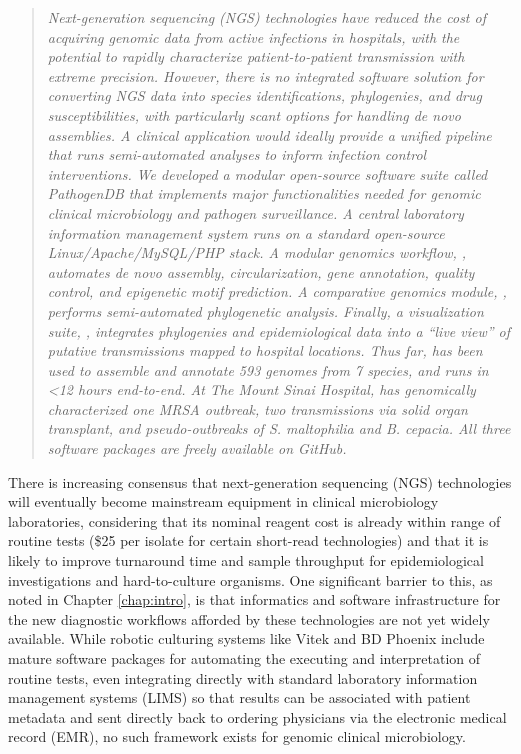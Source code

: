 \begin{quote}
\emph{Next-generation sequencing (NGS) technologies have reduced the cost of acquiring genomic data from active infections in hospitals, with the potential to rapidly characterize patient-to-patient transmission with extreme precision. However, there is no integrated software solution for converting NGS data into species identifications, phylogenies, and drug susceptibilities, with particularly scant options for handling \emph{de novo} assemblies. A clinical application would ideally provide a unified pipeline that runs semi-automated analyses to inform infection control interventions. We developed a modular open-source software suite called PathogenDB that implements major functionalities needed for genomic clinical microbiology and pathogen surveillance. A central laboratory information management system runs on a standard open-source Linux/Apache/MySQL/PHP stack. A modular genomics workflow, \pathogendbpipeline, automates de novo assembly, circularization, gene annotation, quality control, and epigenetic motif prediction. A comparative genomics module, \pathogendbcomparison, performs semi-automated phylogenetic analysis. Finally, a visualization suite, \pathogendbviz, integrates phylogenies and epidemiological data into a ``live view'' of putative transmissions mapped to hospital locations. Thus far, \pathogendbpipeline{} has been used to assemble and annotate 593 genomes from 7 species, and runs in <12 hours end-to-end. At The Mount Sinai Hospital, \pathogendbcomparison{} has genomically characterized one MRSA outbreak, two transmissions via solid organ transplant, and pseudo-outbreaks of \emph{S. maltophilia} and \emph{B. cepacia}. All three software packages are freely available on GitHub.
}
\end{quote}

There is increasing consensus that next-generation sequencing (NGS) technologies will eventually become mainstream equipment in clinical microbiology laboratories, considering that its nominal reagent cost is already within range of routine tests (\$25 per isolate for certain short-read technologies) and that it is likely to improve turnaround time and sample throughput for epidemiological investigations and hard-to-culture organisms.\autocite{Didelot2012,Koser2012} One significant barrier to this, as noted in Chapter \ref{chap:intro}, is that informatics and software infrastructure for the new diagnostic workflows afforded by these technologies are not yet widely available. While robotic culturing systems like Vitek and BD Phoenix include mature software packages for automating the executing and interpretation of routine tests, even integrating directly with standard laboratory information management systems (LIMS) so that results can be associated with patient metadata and sent directly back to ordering physicians via the electronic medical record (EMR), no such framework exists for genomic clinical microbiology.

